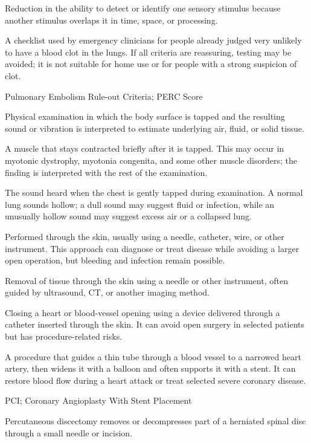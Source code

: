  Reduction in the ability to detect or identify one sensory stimulus because another stimulus overlaps it in time, space, or processing.

 A checklist used by emergency clinicians for people already judged very unlikely to have a blood clot in the lungs. If all criteria are reassuring, testing may be avoided; it is not suitable for home use or for people with a strong suspicion of clot.

\synonyms
Pulmonary Embolism Rule-out Criteria; PERC Score

 Physical examination in which the body surface is tapped and the resulting sound or vibration is interpreted to estimate underlying air, fluid, or solid tissue.

 A muscle that stays contracted briefly after it is tapped. This may occur in myotonic dystrophy, myotonia congenita, and some other muscle disorders; the finding is interpreted with the rest of the examination.

 The sound heard when the chest is gently tapped during examination. A normal lung sounds hollow; a dull sound may suggest fluid or infection, while an unusually hollow sound may suggest excess air or a collapsed lung.

 Performed through the skin, usually using a needle, catheter, wire, or other instrument. This approach can diagnose or treat disease while avoiding a larger open operation, but bleeding and infection remain possible.

 Removal of tissue through the skin using a needle or other instrument, often guided by ultrasound, CT, or another imaging method.

 Closing a heart or blood-vessel opening using a device delivered through a catheter inserted through the skin. It can avoid open surgery in selected patients but has procedure-related risks.

 A procedure that guides a thin tube through a blood vessel to a narrowed heart artery, then widens it with a balloon and often supports it with a stent. It can restore blood flow during a heart attack or treat selected severe coronary disease.

\synonyms
PCI; Coronary Angioplasty With Stent Placement

 Percutaneous discectomy removes or decompresses part of a herniated spinal disc through a small needle or incision.

